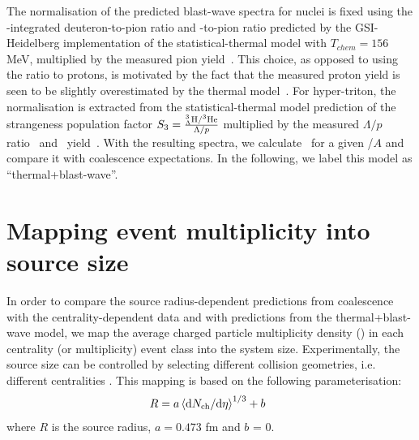 \documentclass[%
 reprint,
 amsmath,amssymb,
 aps,
]{revtex4-1}
\begin{document}
The normalisation of the predicted blast-wave spectra for nuclei is fixed using the \pt-integrated deuteron-to-pion ratio and \hethree-to-pion ratio predicted by the GSI-Heidelberg implementation of the statistical-thermal model with $T_{chem} = 156$ MeV, multiplied by the measured pion yield~\cite{Abelev:2013vea}. 
This choice, as opposed to using the ratio to protons, is motivated by the fact that the measured proton yield is seen to be slightly overestimated by the thermal model~\cite{Abelev:2012wca}.
For hyper-triton, the normalisation is extracted from the statistical-thermal model prediction of the strangeness population factor \mbox{$S_{3} = { _{\Lambda}^{3}\mathrm{H} / ^{3}{\mathrm{He}} \over \Lambda/p}$} multiplied by the measured $\Lambda/p$ ratio~\cite{Abelev:2013vea,Abelev:2013xaa} and \hethree~yield~\cite{ALICE:deuteronppPbPb2015}. 
With the resulting spectra, we calculate \bA~for a given \pt/$A$ and compare it with coalescence expectations. 
In the following, we label this model as ``thermal+blast-wave''.

\section{Mapping event multiplicity into source size} \label{sec:radiiParamet}
In order to compare the source radius-dependent predictions from coalescence with the centrality-dependent data and with predictions from the thermal+blast-wave model, we map the average charged particle multiplicity density (\avdNdeta) in each centrality (or multiplicity) event class into the system size. 
Experimentally, the source size can be controlled by selecting different collision geometries, i.e. different centralities \cite{Abelev:2013qoq}. 
This mapping is based on the following parameterisation:
%
\begin{equation}
R = a \left<\mathrm{d}N_\mathrm{ch}/\mathrm{d}\eta\right>^{1/3} + b\;\;
\label{eq:radiusParameterisation}
\end{equation}
%
\noindent where $R$ is the source radius, $a = 0.473$ fm and $b$ = 0. 
\end{document}
